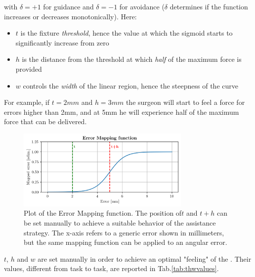 \documentclass[../main.tex]{subfiles}
\begin{document}
with $\delta = +1$ for guidance \vfs and $\delta = -1$ for avoidance \vfs ($\delta$ determines if the function increases or decreases monotonically). Here:
\begin{itemize}
  \item $t$ is the fixture \textit{threshold}, hence the value at which the sigmoid starts to significantly increase from zero
  \item $h$ is the distance from the threshold at which \textit{half} of the maximum force is provided
  \item $w$ controls the \textit{width} of the linear region, hence the steepness of the curve 
\end{itemize}
For example, if $t=2\si{mm}$ and $h=3\si{mm}$ the surgeon will start to feel a force for errors higher than 2\si{mm}, and at 5\si{mm} he will experience half of the maximum force that can be delivered.

\begin{figure}[h!]
  \centering
      \includegraphics[width=0.75\textwidth]{images/mappingfunction.png}
      \caption{Plot of the Error Mapping function. The position of$t$ and $t+h$ can be set manually to achieve a suitable behavior of the assistance strategy. The x-axis refers to a generic error shown in millimeters, but the same mapping function can be applied to an angular error.} 
      \label{fig:mappingfunctiion}
\end{figure}

$t$, $h$ and $w$ are set manually in order to achieve an optimal "feeling" of the \vf. Their values, different from task to task, are reported in Tab.\ref{tab:thwvalues}.
\end{document}
